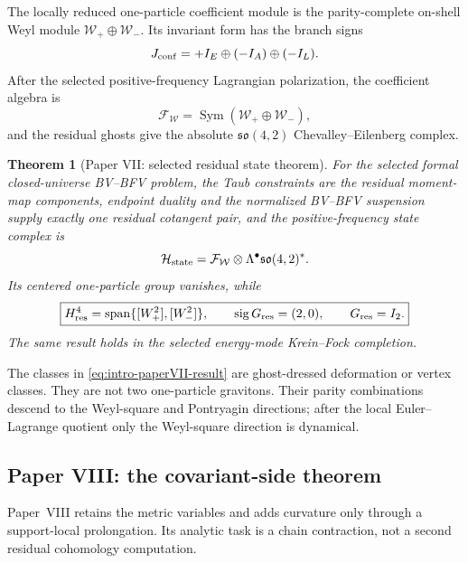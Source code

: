 \documentclass[11pt]{article}
\newtheorem{theorem}{Theorem}[section]
\theoremstyle{remark}
\begin{document}
The locally reduced one-particle coefficient module is the parity-complete
on-shell Weyl module $\mathcal W_+\oplus\mathcal W_-$.  Its invariant form
has the branch signs
\begin{equation}
 J_{\rm conf}=+I_E\oplus(-I_A)\oplus(-I_L).
\end{equation}
After the selected positive-frequency Lagrangian polarization, the
coefficient algebra is
\begin{equation}
 \mathcal F_{\mathcal W}
 =\operatorname{Sym}(\mathcal W_+\oplus\mathcal W_-),
\end{equation}
and the residual ghosts give the absolute
$\mathfrak{so}(4,2)$ Chevalley--Eilenberg complex.

\begin{theorem}[Paper VII: selected residual state theorem]
\label{thm:intro-paper-vii}
For the selected formal closed-universe BV--BFV problem, the Taub
constraints are the residual moment-map components, endpoint duality and
the normalized BV--BFV suspension supply exactly one residual cotangent
pair, and the positive-frequency state complex is
\begin{equation}
 \mathcal H_{\rm state}
 =\mathcal F_{\mathcal W}\otimes
  \Lambda^\bullet\mathfrak{so}(4,2)^*.
\end{equation}
Its centered one-particle group vanishes, while
\begin{equation}\label{eq:intro-paperVII-result}
 \boxed{
 H^4_{\rm res}
 =\operatorname{span}\{[W_+^2],[W_-^2]\},
 \qquad \operatorname{sig}G_{\rm res}=(2,0),
 \qquad G_{\rm res}=I_2.}
\end{equation}
The same result holds in the selected energy-mode Krein--Fock completion.
\end{theorem}

The classes in \eqref{eq:intro-paperVII-result} are ghost-dressed
deformation or vertex classes.  They are not two one-particle gravitons.
Their parity combinations descend to the Weyl-square and Pontryagin
directions; after the local Euler--Lagrange quotient only the Weyl-square
direction is dynamical.

\subsection{Paper VIII: the covariant-side theorem}

Paper~VIII retains the metric variables and adds curvature only through a
support-local prolongation.  Its analytic task is a chain contraction, not a
second residual cohomology computation.
\end{document}

